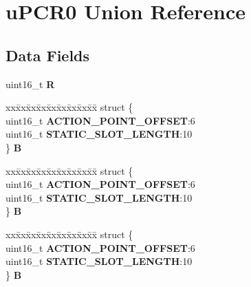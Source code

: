 \hypertarget{unionuPCR0}{}\section{u\+P\+C\+R0 Union Reference}
\label{unionuPCR0}
\subsection*{Data Fields}
\begin{DoxyCompactItemize}
\item 
\mbox{\label{unionuPCR0_a172ec37ea3d04843df908334a49a15a3}} 
uint16\+\_\+t {\bfseries R}
\item 
\mbox{\label{unionuPCR0_ab248bb95aac8413c49f36e0b6ca8c7cf}} 
\begin{tabbing}
xx\=xx\=xx\=xx\=xx\=xx\=xx\=xx\=xx\=\kill
struct \{\\
\>uint16\_t {\bfseries ACTION\_POINT\_OFFSET}:6\\
\>uint16\_t {\bfseries STATIC\_SLOT\_LENGTH}:10\\
\} {\bfseries B}\\

\end{tabbing}\item 
\mbox{\label{unionuPCR0_a2fec597a261d7c592b205676d3005112}} 
\begin{tabbing}
xx\=xx\=xx\=xx\=xx\=xx\=xx\=xx\=xx\=\kill
struct \{\\
\>uint16\_t {\bfseries ACTION\_POINT\_OFFSET}:6\\
\>uint16\_t {\bfseries STATIC\_SLOT\_LENGTH}:10\\
\} {\bfseries B}\\

\end{tabbing}\item 
\mbox{\label{unionuPCR0_a9e41d0a25294a15627a325716aff81cd}} 
\begin{tabbing}
xx\=xx\=xx\=xx\=xx\=xx\=xx\=xx\=xx\=\kill
struct \{\\
\>uint16\_t {\bfseries ACTION\_POINT\_OFFSET}:6\\
\>uint16\_t {\bfseries STATIC\_SLOT\_LENGTH}:10\\
\} {\bfseries B}\\


\end{tabbing}
\end{DoxyCompactItemize}
